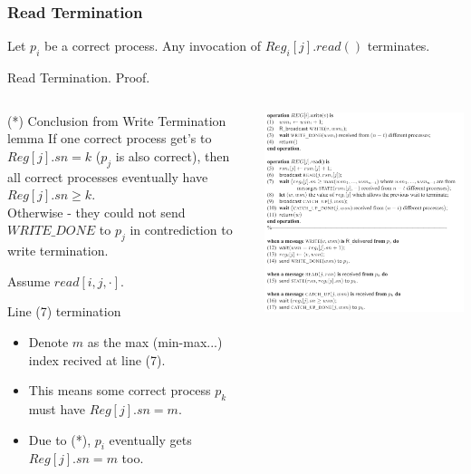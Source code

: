 \begin{frame}
    \frametitle{Read Termination}
    \begin{lemma}
        Let $p_i$ be a correct process. Any invocation of $Reg_i[j].read()$ terminates.
    \end{lemma}
\end{frame}


\begin{frame}{Read Termination. Proof.}
    \begin{columns}[T]
        \begin{column}{.5\textwidth}
            \begin{block}{(*) Conclusion from Write Termination lemma}
                If one correct process get's to $Reg[j].sn=k$ ($p_j$ is also correct),
                then all correct processes eventually have $Reg[j].sn\geq k$.\\
                Otherwise - they could not send $WRITE\_DONE$ to
                $p_j$ in contrediction to write termination.
            \end{block}
            Assume $read[i,j,\cdot]$.
            \begin{block}{Line (7) termination}
                \begin{itemize}
                    \item Denote $m$ as the max (min-max...) index recived at line (7).
                    \item This means some correct process $p_k$ must have $Reg[j].sn=m$.
                    \item Due to (*), $p_i$ eventually gets $Reg[j].sn=m$ too.
                \end{itemize}
            \end{block}
        \end{column}
        \begin{column}{.5\textwidth}
            \includegraphics[scale=.465]{resources/mainalg.png}

\end{column}
\end{columns}
\end{frame}
